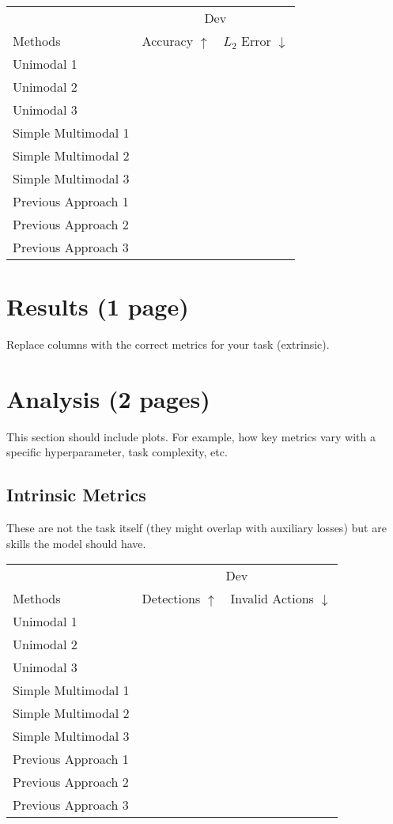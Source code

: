 \documentclass[11pt,a4paper]{article}
\begin{document}
\clearpage
\begin{table}[t]
\centering
\begin{tabular}{@{}lrr@{}}
\toprule
                            & \multicolumn{2}{c}{Dev} \\
Methods                     & Accuracy $\uparrow$ & $L_2$ Error $\downarrow$  \\
\midrule
Unimodal 1 \cite{} & & \\
Unimodal 2 \cite{} & & \\
Unimodal 3 \cite{} & & \\
\midrule
Simple Multimodal 1 \cite{} & & \\
Simple Multimodal 2 \cite{} & & \\
Simple Multimodal 3 \cite{} & & \\
\midrule
Previous Approach 1 \cite{} & & \\
Previous Approach 2 \cite{} & & \\
Previous Approach 3 \cite{} & & \\
\bottomrule
\end{tabular}
\end{table}
\section{Results (1 page)}
Replace columns with the correct metrics for your task (extrinsic).

\clearpage
\section{Analysis (2 pages)}
This section should include plots.  For example, how key metrics vary with a specific hyperparameter, task complexity, etc.

\subsection{Intrinsic Metrics}
These are not the task itself (they might overlap with auxiliary losses) but are skills the model should have.
\begin{table}[t]
\centering
\begin{tabular}{@{}lrr@{}}
\toprule
                            & \multicolumn{2}{c}{Dev} \\
Methods                     & Detections $\uparrow$ & Invalid Actions $\downarrow$  \\
\midrule
Unimodal 1 \cite{} & & \\
Unimodal 2 \cite{} & & \\
Unimodal 3 \cite{} & & \\
\midrule
Simple Multimodal 1 \cite{} & &  \\
Simple Multimodal 2 \cite{} & &  \\
Simple Multimodal 3 \cite{} & &  \\
\midrule
Previous Approach 1 \cite{} & &  \\
Previous Approach 2 \cite{} & &  \\
Previous Approach 3 \cite{} & &  \\
\bottomrule
\end{tabular}
\end{table}
\end{document}
